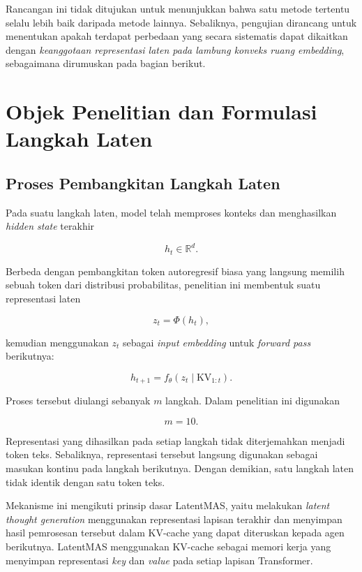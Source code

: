 Rancangan ini tidak ditujukan untuk menunjukkan bahwa satu metode tertentu selalu lebih baik daripada metode lainnya. Sebaliknya, pengujian dirancang untuk menentukan apakah terdapat perbedaan yang secara sistematis dapat dikaitkan dengan \textit{keanggotaan representasi laten pada lambung konveks ruang embedding}, sebagaimana dirumuskan pada bagian berikut.

\section{Objek Penelitian dan Formulasi Langkah Laten}

\subsection{Proses Pembangkitan Langkah Laten}

Pada suatu langkah laten, model telah memproses konteks dan menghasilkan \textit{hidden state} terakhir

\[
h_t\in\mathbb{R}^{d}.
\]

Berbeda dengan pembangkitan token autoregresif biasa yang langsung memilih sebuah token dari distribusi probabilitas, penelitian ini membentuk suatu representasi laten

\begin{equation}
z_t=\Phi(h_t),
\end{equation}

kemudian menggunakan \(z_t\) sebagai \textit{input embedding} untuk \textit{forward pass} berikutnya:

\begin{equation}
h_{t+1}
=
f_\theta
\left(
z_t\mid \mathrm{KV}_{1:t}
\right).
\end{equation}

Proses tersebut diulangi sebanyak \(m\) langkah. Dalam penelitian ini digunakan

\begin{equation}
m=10.
\end{equation}

Representasi yang dihasilkan pada setiap langkah tidak diterjemahkan menjadi token teks. Sebaliknya, representasi tersebut langsung digunakan sebagai masukan kontinu pada langkah berikutnya. Dengan demikian, satu langkah laten tidak identik dengan satu token teks.

Mekanisme ini mengikuti prinsip dasar LatentMAS, yaitu melakukan \textit{latent thought generation} menggunakan representasi lapisan terakhir dan menyimpan hasil pemrosesan tersebut dalam KV-cache yang dapat diteruskan kepada agen berikutnya. LatentMAS menggunakan KV-cache sebagai memori kerja yang menyimpan representasi \textit{key} dan \textit{value} pada setiap lapisan Transformer.

